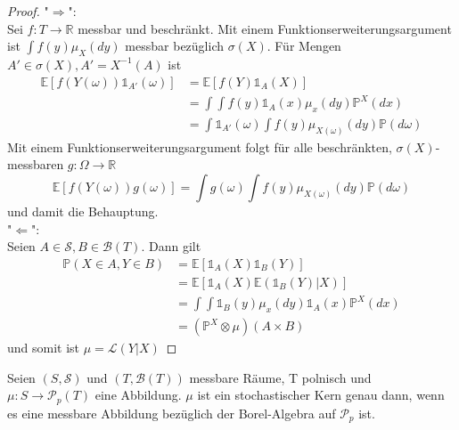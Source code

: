 \begin{proof}
    "$\Rightarrow$": \\
    Sei $f:T\rightarrow \mathbb{R}$ messbar und beschränkt. Mit einem Funktionserweiterungsargument ist $\int f(y)\mu_X(dy)$ messbar bezüglich $\sigma(X)$. Für Mengen $A' \in \sigma(X), A'=X^{-1}(A)$ ist 
    \begin{align*}
    \mathbb{E}\left[f(Y(\omega))\mathds{1}_{A'}(\omega)\right] &= \mathbb{E}\left[f(Y)\mathds{1}_A(X)\right]\\
    &=\int \int f(y) \mathds{1}_A(x)\mu_x(dy)\mathbb{P}^X(dx) \\
    &= \int \mathds{1}_{A'}(\omega) \int f(y)\mu_{X(\omega)}(dy) \mathbb{P}(d\omega)
    \end{align*}
    Mit einem Funktionserweiterungsargument folgt für alle beschränkten, $\sigma(X)$-messbaren $g: \Omega\rightarrow \mathbb{R}$
    $$\mathbb{E}\left[f(Y(\omega))g(\omega)\right] = \int g(\omega)\int f(y)\mu_{X(\omega)}(dy)\mathbb{P}(d\omega)$$
    und damit die Behauptung. \\
    "$\Leftarrow$": \\
    Seien $A \in \mathcal{S}, B\in \mathcal{B}(T)$. Dann gilt
    \begin{align*}
        \mathbb{P}(X\in A, Y\in B) &= \mathbb{E}\left[\mathds{1}_A(X) \mathds{1}_B(Y)\right] \\
        &= \mathbb{E}\left[\mathds{1}_A(X)\mathbb{E}(\mathds{1}_B(Y)\vert X)\right] \\
        &= \int \int \mathds{1}_B(y) \mu_x(dy) \mathds{1}_A(x)\mathbb{P}^X(dx) \\
        &= (\mathbb{P}^X \otimes \mu)(A\times B)
    \end{align*}
    und somit ist $\mu=\mathcal{L}(Y\vert X)$
\end{proof}
\begin{lemma}\label{thm:kernel_characterization}
    Seien $(S, \mathcal{S})$ und $(T, \mathcal{B}(T))$ messbare Räume, T polnisch und $\mu: S\rightarrow \mathcal{P}_p(T)$ eine Abbildung. $\mu$ ist ein stochastischer Kern genau dann, wenn es eine messbare Abbildung bezüglich der Borel-Algebra auf $\mathcal{P}_p$ ist.
\end{lemma}
